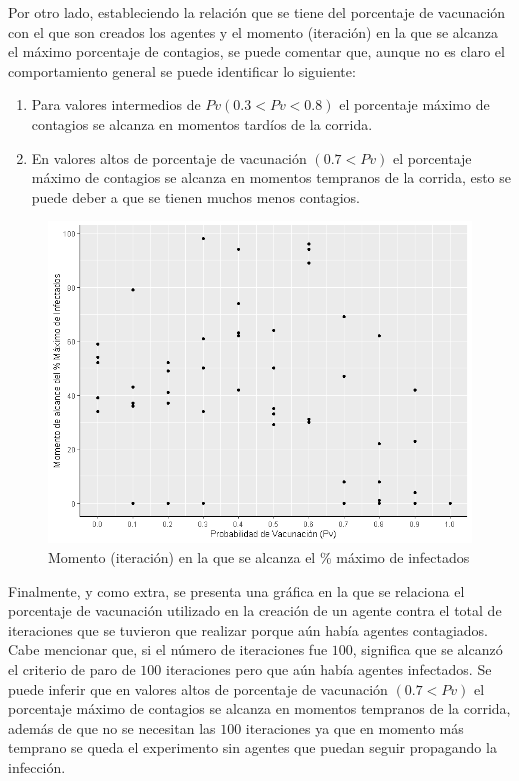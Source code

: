 \documentclass{article}
\begin{document}
Por otro lado, estableciendo la relación que se tiene del porcentaje de vacunación con el que son creados los agentes y el momento (iteración) en la que se alcanza el máximo porcentaje de contagios, se puede comentar que, aunque no es claro el comportamiento general se puede identificar lo siguiente: 
\begin{enumerate}
\item Para valores intermedios de $Pv (0.3 < Pv <0.8)$ el porcentaje máximo de contagios se alcanza en momentos tardíos de la corrida. 
\item En valores altos de porcentaje de vacunación $(0.7 < Pv)$ el porcentaje máximo de contagios se alcanza en momentos tempranos de la corrida, esto se puede deber a que se tienen muchos menos contagios.
\end{enumerate}



\begin{figure}[h]
	\centering
	\includegraphics[width=0.6\linewidth]{Rplot2}
	\caption{Momento (iteración) en la que se alcanza el \% máximo de infectados}
	\label{fig:imagen2}
\end{figure}

Finalmente, y como extra, se presenta una gráfica en la que se relaciona el porcentaje de vacunación utilizado en la creación de un agente contra el total de iteraciones que se tuvieron que realizar porque aún había agentes contagiados.  Cabe mencionar que, si el número de iteraciones fue $100$, significa que se alcanzó el criterio de paro de $100$ iteraciones pero que aún había agentes infectados. Se puede inferir que en valores altos de porcentaje de vacunación $(0.7 < Pv)$ el porcentaje máximo de contagios se alcanza en momentos tempranos de la corrida, además de que no se necesitan las $100$ iteraciones ya que en momento más temprano se queda el experimento sin agentes que puedan seguir propagando la infección.
\end{document}
